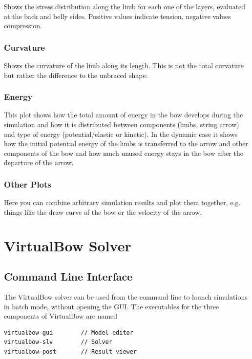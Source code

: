 \documentclass[12pt]{article}
\begin{document}
Shows the stress distribution along the limb for each one of the layers, evaluated at the back and belly sides.
Positive values indicate tension, negative values compression.

\subsubsection{Curvature}

Shows the curvature of the limb along its length.
This is not the total curvature but rather the difference to the unbraced shape.

\subsubsection{Energy}

This plot shows how the total amount of energy in the bow develops during the simulation and how it is distributed between components (limbs, string arrow) and type of energy (potential/elastic or kinetic).
In the dynamic case it shows how the initial potential energy of the limbs is transferred to the arrow and other components of the bow and how much unused energy stays in the bow after the departure of the arrow.

\subsubsection{Other Plots}

Here you can combine arbitrary simulation results and plot them together, e.g. things like the draw curve of the bow or the velocity of the arrow.

\newpage
\section{VirtualBow Solver}

\subsection{Command Line Interface}

The VirtualBow solver can be used from the command line to launch simulations in batch mode, without opening the GUI.
The executables for the three components of VirtualBow are named

\begin{framed}
\begin{verbatim}
virtualbow-gui        // Model editor
virtualbow-slv        // Solver
virtualbow-post       // Result viewer
\end{verbatim}
\end{framed}
\end{document}
